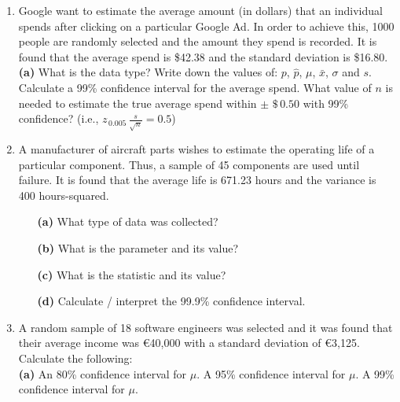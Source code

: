 \documentclass[]{report}
\begin{document}
\begin{enumerate}
	\item 
	Google want to estimate the average amount (in dollars) that an individual spends after clicking on a particular Google Ad. In order to achieve this, 1000 people are randomly selected and the amount they spend is recorded. It is found that the average spend is \$42.38 and the standard deviation is \$16.80.\\[-0.2cm]
	
	
	{\bf(a)} What is the data type?  Write down the values of: $p$, $\hat p$, $\mu$, $\bar x$, $\sigma$ and $s$.  Calculate a 99\% confidence interval for the average spend.  What value of $n$ is needed to estimate the true average spend within $\pm \,\, \$\,0.50$ with 99\% confidence? (i.e., $z_{\,0.005}\,\frac{s}{\sqrt{n}} = 0.5$)
	
	
	
	
	
	\item 
	A manufacturer of aircraft parts wishes to estimate the operating life of a particular component. Thus, a sample of 45 components are used until failure. It is found that the average life is 671.23 hours and the variance is 400 hours-squared.
	\begin{itemize}
		\item[{\bf(a)}] What type of data was collected? \quad \item[{\bf(b)}] What is the parameter and its value? \quad \item[{\bf(c)}] What is the statistic and its value? \quad \item[{\bf(d)}] Calculate / interpret the 99.9\% confidence interval.
	\end{itemize}
	
	
	
	
	\item 
	A random sample of 18 software engineers was selected and it was found that their average income was \euro{40,000} with a standard deviation of \euro{3,125}. \\[-0.2cm]
	
	Calculate the following:\\[0.2cm]
	{\bf(a)} An 80\% confidence interval for $\mu$.  A 95\% confidence interval for $\mu$.  A 99\% confidence interval for $\mu$.
	

\end{enumerate}
\end{document}
